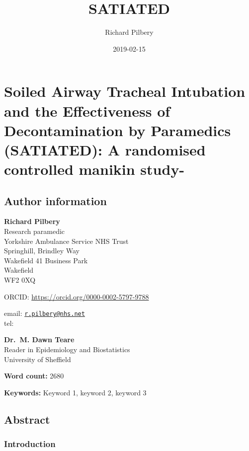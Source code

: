 \documentclass[]{article}
\title{SATIATED}
\author{Richard Pilbery}
\date{2019-02-15}
\begin{document}
\maketitle

\hypertarget{soiled-airway-tracheal-intubation-and-the-effectiveness-of-decontamination-by-paramedics-satiated-a-randomised-controlled-manikin-study-}{%
\section{Soiled Airway Tracheal Intubation and the Effectiveness of
Decontamination by Paramedics (SATIATED): A randomised controlled
manikin
study-}\label{soiled-airway-tracheal-intubation-and-the-effectiveness-of-decontamination-by-paramedics-satiated-a-randomised-controlled-manikin-study-}}

\hypertarget{author-information}{%
\subsection{Author information}\label{author-information}}

\textbf{Richard Pilbery}\\
Research paramedic\\
Yorkshire Ambulance Service NHS Trust\\
Springhill, Brindley Way\\
Wakefield 41 Business Park\\
Wakefield\\
WF2 0XQ

ORCID: \url{https://orcid.org/0000-0002-5797-9788}

email: \href{mailto:r.pilbery@nhs.net}{\nolinkurl{r.pilbery@nhs.net}}\\
tel:

\textbf{Dr.~M. Dawn Teare}\\
Reader in Epidemiology and Biostatistics\\
University of Sheffield

\textbf{Word count:} 2680

\textbf{Keywords:} Keyword 1, keyword 2, keyword 3

\hypertarget{abstract}{%
\subsection{Abstract}\label{abstract}}

\hypertarget{introduction}{%
\subsubsection{Introduction}\label{introduction}}
\end{document}
